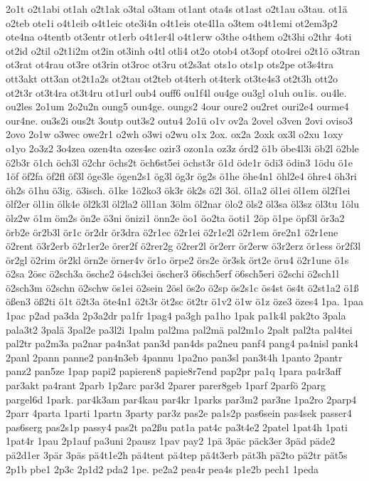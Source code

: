 {2o1t
o2t1abi
ot1ah
o2t1ak
o3tal
o3tam
ot1ant
ota4s
ot1ast
o2t1au
o3tau.
ot1ä
o2teb
ote1i
o4t1eib
o4t1eic
ote3i4n
o4t1eis
ote4l1a
o3tem
o4t1emi
ot2em3p2
ote4na
o4tentb
ot3entr
ot1erb
o4t1er4l
o4t1erw
o3the
o4them
o2t3hi
o2thr
4oti
ot2id
o2til
o2t1i2m
ot2in
ot3inh
o4tl
otli4
ot2o
otob4
ot3opf
oto4rei
o2t1ö
o3tran
ot3rat
ot4rau
ot3re
ot3rin
ot3roc
ot3ru
ot2s3at
ots1o
ots1p
ots2pe
ot3s4tra
ott3akt
ott3an
ot2t1a2s
ot2tau
ot2teb
ot4terh
ot4terk
ot3te4s3
ot2t3h
ott2o
ot2t3r
ot3t4ra
ot3t4ru
ot1url
oub4
ouff6
ou1f4l
ou4ge
ou3gl
o1uh
ou1is.
ou4le.
ou2les
2o1um
2o2u2n
oung5
oun4ge.
oungs2
4our
oure2
ou2ret
ouri2e4
ourme4
our4ne.
ou3s2i
ous2t
3outp
out3s2
outu4
2o1ü
o1v
ov2a
2ovel
o3ven
2ovi
oviso3
2ovo
2o1w
o3wec
owe2r1
o2wh
o3wi
o2wu
o1x
2ox.
ox2a
2oxk
ox3l
o2xu
1oxy
o1yo
2o3z2
3o4zea
ozen4ta
ozes4sc
ozir3
ozon1a
oz3z
órd2
ö1b
öbe4l3i
öb2l
ö2ble
ö2b3r
ö1ch
öch3l
ö2chr
öchs2t
öch6st5ei
öchst3r
ö1d
öde1r
ödi3
ödin3
1ödu
ö1e
1öf
öf2fa
öf2fl
öf3l
öge3le
ögen2s1
ög3l
ög3r
ög2s
ö1he
öhe4n1
öhl2e4
öhre4
öh3ri
öh2s
ö1hu
ö3ig.
ö3isch.
ö1ke
1ö2ko3
ök3r
ök2s
ö2l
3öl.
öl1a2
öl1ei
öl1em
öl2f1ei
ölf2er
öl1in
ölk4e
öl2k3l
öl2la2
öll1an
3ölm
öl2nar
ölo2
öls2
öl3sa
öl3sz
öl3tu
1ölu
ölz2w
ö1m
öm2s
ön2e
ö3ni
önizi1
önn2e
öo1
öo2ta
öoti1
2öp
ö1pe
öpf3l
ör3a2
örb2e
ör2b3l
ör1c
ör2dr
ör3dra
ö2r1ec
ö2r1ei
ö2r1e2l
ö2r1em
öre2n1
ö2r1ene
ö2rent
ö3r2erb
ö2r1er2e
örer2f
ö2rer2g
ö2rer2l
ör2err
ör2erw
ö3r2erz
ör1ess
ör2f3l
ör2gl
ö2rim
ör2kl
örn2e
örner4v
ör1o
örpe2
örs2e
ör3sk
ört2e
öru4
ö2r1une
ö1s
ö2sa
2ösc
ö2sch3a
ösche2
ö4sch3ei
öscher3
ö6sch5erf
ö6sch5eri
ö2schi
ö2sch1l
ö2sch3m
ö2schn
ö2schw
ös1ei
ö2sein
2ösl
ös2o
ö2sp
ös2s1c
ös4st
ös4t
ö2st1a2
ö1ß
ößen3
öß2ti
ö1t
ö2t3a
öte4n1
ö2t3r
öt2sc
öt2tr
ö1v2
ö1w
ö1z
öze3
özes4
1pa.
1paa
1pac
p2ad
pa3da
2p3a2dr
pa1fr
1pag4
pa3gh
pa1ho
1pak
pa1k4l
pak2to
3pala
pala3t2
3palä
3pal2e
pa3l2i
1palm
pal2ma
pal2mä
pal2m1o
2palt
pal2ta
pal4tei
pal2tr
pa2m3a
pa2nar
pa4n3at
pan3d
pan4ds
pa2neu
panf4
pang4
pa4nisl
pank4
2panl
2pann
panne2
pan4n3eb
4pannu
1pa2no
pan3sl
pan3t4h
1panto
2pantr
panz2
pan5ze
1pap
papi2
papieren8
papie8r7end
pap2pr
pa1q
1para
pa4r3aff
par3akt
pa4rant
2parb
1p2arc
par3d
2parer
parer8geb
1parf
2parfö
2parg
pargel6d
1park.
par4k3am
par4kau
par4kr
1parks
par3m2
par3ne
1pa2ro
2parp4
2parr
4parta
1parti
1partn
3party
par3z
pas2e
pa1s2p
pas6sein
pas4sek
passer4
pas6serg
pas2s1p
passy4
pas2t
pa2ßu
pat1a
pat4c
pa3t4e2
2patel
1pat4h
1pati
1pat4r
1pau
2p1auf
pa3uni
2pausz
1pav
pay2
1pä
3päc
päck3er
3päd
päde2
pä2d1er
3pär
3päs
pä4t1e2h
pä4tent
pä4tep
pä4t3erb
pät3h
pä2to
pä2tr
pät5s
2p1b
pbe1
2p3c
2p1d2
pda2
1pe.
pe2a2
pea4r
pea4s
p1e2b
pech1
1peda
}
